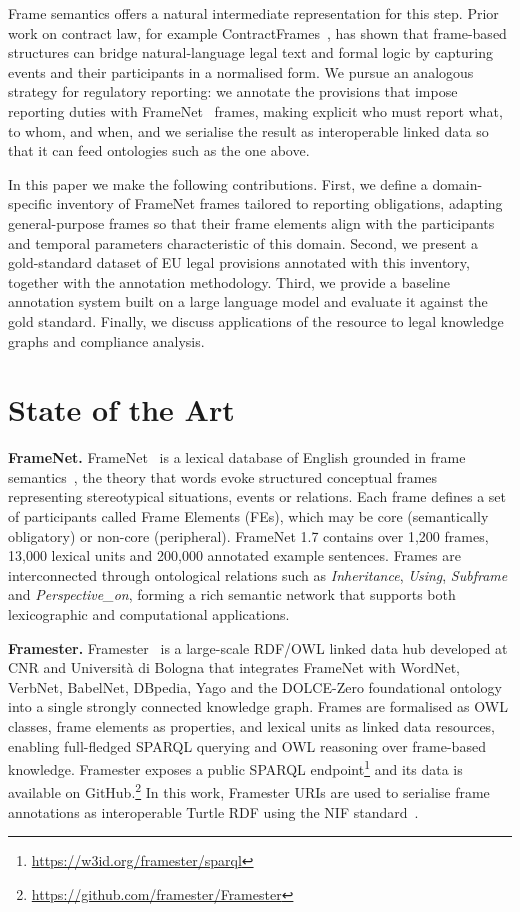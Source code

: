 \documentclass[10pt, a4paper, twocolumn]{article}
\begin{document}
Frame semantics offers a natural intermediate representation for this step.
Prior work on contract law, for example
ContractFrames~\cite{navas-loro-2019-contractframes}, has shown that
frame-based structures can bridge natural-language legal text and formal logic
by capturing events and their participants in a normalised form. We pursue an
analogous strategy for regulatory reporting: we annotate the provisions that
impose reporting duties with FrameNet~\cite{baker-etal-1998-berkeley} frames,
making explicit who must report what, to whom, and when, and we serialise the
result as interoperable linked data so that it can feed ontologies such as the
one above.

In this paper we make the following contributions. First, we define a
domain-specific inventory of FrameNet frames tailored to reporting obligations,
adapting general-purpose frames so that their frame elements align with the
participants and temporal parameters characteristic of this domain. Second, we
present a gold-standard dataset of EU legal provisions annotated with this
inventory, together with the annotation methodology. Third, we provide a
baseline annotation system built on a large language model and evaluate it
against the gold standard. Finally, we discuss applications of the resource to
legal knowledge graphs and compliance analysis.

\section{State of the Art}
\label{sec:soa}

\textbf{FrameNet.}
FrameNet~\cite{baker-etal-1998-berkeley} is a lexical database of English grounded in
frame semantics~\cite{fillmore-1982-frame}, the theory that words evoke structured
conceptual frames representing stereotypical situations, events or relations.
Each frame defines a set of participants called Frame Elements (FEs), which may
be core (semantically obligatory) or non-core (peripheral). FrameNet 1.7
contains over 1{,}200 frames, 13{,}000 lexical units and 200{,}000 annotated
example sentences. Frames are interconnected through ontological relations such
as \textit{Inheritance}, \textit{Using}, \textit{Subframe} and
\textit{Perspective\_on}, forming a rich semantic network that supports both
lexicographic and computational applications.

\textbf{Framester.}
Framester~\cite{gangemi2016framester} is a large-scale RDF/OWL linked data hub
developed at CNR and Università di Bologna that integrates FrameNet with
WordNet, VerbNet, BabelNet, DBpedia, Yago and the DOLCE-Zero foundational
ontology into a single strongly connected knowledge graph. Frames are
formalised as OWL classes, frame elements as properties, and lexical units as
linked data resources, enabling full-fledged SPARQL querying and OWL reasoning
over frame-based knowledge. Framester exposes a public SPARQL
endpoint\footnote{\url{https://w3id.org/framester/sparql}} and its data is
available on GitHub.\footnote{\url{https://github.com/framester/Framester}}
In this work, Framester URIs are used to serialise frame annotations as
interoperable Turtle RDF using the NIF standard~\cite{hellmann2013nif}.
\end{document}
